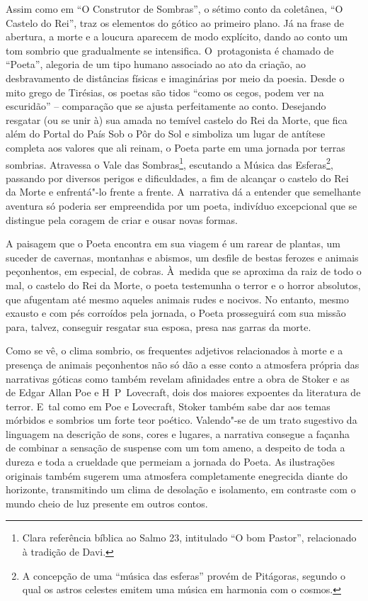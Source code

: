 Assim como em ``O Construtor de Sombras'', o sétimo conto da coletânea,
``O Castelo do Rei'', traz os elementos do gótico ao primeiro plano. Já
na frase de abertura, a morte e a loucura aparecem de modo explícito,
dando ao conto um tom sombrio que gradualmente se intensifica. O~protagonista é chamado de ``Poeta'', alegoria de um tipo humano
associado ao ato da criação, ao desbravamento de distâncias físicas e
imaginárias por meio da poesia. Desde o mito grego de Tirésias, os
poetas são tidos ``como os cegos, podem ver na escuridão'' -- comparação
que se ajusta perfeitamente ao conto. Desejando resgatar (ou se unir à)
sua amada no temível castelo do Rei da Morte, que fica além do Portal do
País Sob o Pôr do Sol e simboliza um lugar de antítese completa aos
valores que ali reinam, o Poeta parte em uma jornada por terras
sombrias. Atravessa o Vale das Sombras\footnote{Clara referência bíblica ao Salmo 23,
intitulado ``O bom Pastor'', relacionado à tradição de Davi.
},
escutando a Música das Esferas\footnote{A concepção de uma ``música das esferas''
provém de Pitágoras, segundo o qual os astros celestes emitem uma música
em harmonia com o cosmos.}, passando por
diversos perigos e dificuldades, a fim de alcançar o castelo do Rei da
Morte e enfrentá"-lo frente a frente. A~narrativa dá a entender que
semelhante aventura só poderia ser empreendida por um poeta, indivíduo
excepcional que se distingue pela coragem de criar e ousar novas formas.

A paisagem que o Poeta encontra em sua viagem é um rarear de plantas, um
suceder de cavernas, montanhas e abismos, um desfile de bestas ferozes e
animais peçonhentos, em especial, de cobras. À~medida que se aproxima da
raiz de todo o mal, o castelo do Rei da Morte, o poeta testemunha o
terror e o horror absolutos, que afugentam até mesmo aqueles animais
rudes e nocivos. No entanto, mesmo exausto e com pés corroídos pela
jornada, o Poeta prosseguirá com sua missão para, talvez, conseguir
resgatar sua esposa, presa nas garras da morte.

Como se vê, o clima sombrio, os frequentes adjetivos relacionados à
morte e a presença de animais peçonhentos não só dão a esse conto a
atmosfera própria das narrativas góticas como também revelam afinidades
entre a obra de Stoker e as de Edgar Allan Poe e H\, P\, Lovecraft, dois
dos maiores expoentes da literatura de terror. E~tal como em Poe e
Lovecraft, Stoker também sabe dar aos temas mórbidos e sombrios um forte
teor poético. Valendo"-se de um trato sugestivo da linguagem na descrição
de sons, cores e lugares, a narrativa consegue a façanha de combinar a
sensação de suspense com um tom ameno, a despeito de toda a dureza e
toda a crueldade que permeiam a jornada do Poeta. As ilustrações
originais também sugerem uma atmosfera completamente enegrecida diante
do horizonte, transmitindo um clima de desolação e isolamento, em
contraste com o mundo cheio de luz presente em outros contos.

